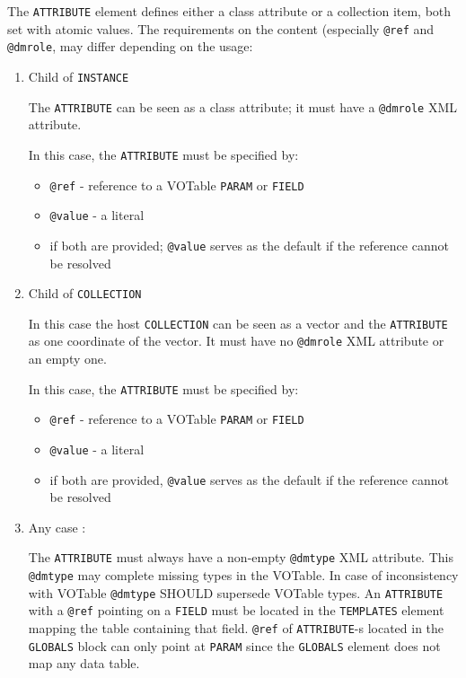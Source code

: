 
The \texttt{ATTRIBUTE} element defines either a class attribute or a collection item, both set with atomic values.
The requirements on
the content (especially \texttt{@ref} and  \texttt{@dmrole}, may differ depending on
the usage:


\begin{enumerate}
\item Child of \texttt{INSTANCE}

 The \texttt{ATTRIBUTE} can be seen as a class attribute;
    it must have a \texttt{@dmrole} XML attribute.

In this case, the \texttt{ATTRIBUTE} must be specified by:
  \begin{itemize} 
      \item \texttt{@ref} - reference to a VOTable \texttt{PARAM} or \texttt{FIELD}
      \item \texttt{@value} - a literal
      \item  if both are provided; \texttt{@value} serves as the default 
      if the reference cannot be resolved
  \end{itemize}  

  
\item Child of \texttt{COLLECTION}

In this case the host \texttt{COLLECTION} can be seen as a vector and the \texttt{ATTRIBUTE} as one coordinate of the vector. 
It must have  no \texttt{@dmrole} XML attribute or an empty one.

In this case, the \texttt{ATTRIBUTE} must be specified by:
  \begin{itemize} 
      \item \texttt{@ref} - reference to a VOTable \texttt{PARAM} or \texttt{FIELD}
      \item \texttt{@value} - a literal
      \item if both are provided, \texttt{@value} serves as the default if 
      the reference cannot be resolved
  \end{itemize}  
              
\item Any case :

    The \texttt{ATTRIBUTE} must always have a non-empty \texttt{@dmtype} XML attribute. 
    This \texttt{@dmtype} may complete missing types in the VOTable. In case of inconsistency with VOTable
    \texttt{@dmtype} SHOULD supersede VOTable types.
    An \texttt{ATTRIBUTE} with a \texttt{@ref} pointing on a \texttt{FIELD} must be located in the \texttt{TEMPLATES} element
    mapping the table containing that field. \texttt{@ref} of \texttt{ATTRIBUTE}-s located in the \texttt{GLOBALS} block can only 
    point at \texttt{PARAM} since the \texttt{GLOBALS} element does not map any data table.
    
\end{enumerate}  
 
